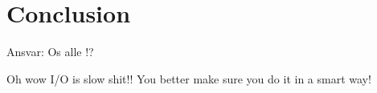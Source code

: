\section{Conclusion}
Ansvar: Os alle !?

Oh wow I/O is slow shit!! You better make sure you do it in a smart way!
